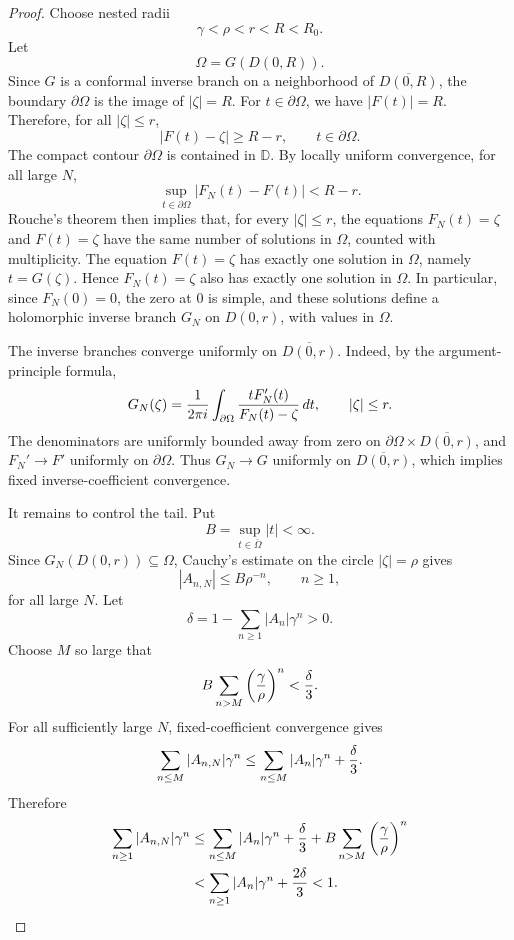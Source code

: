 \documentclass[11pt]{article}
\newcommand{\D}{\mathbb D}
\newcommand{\1}{\mathbf 1}
\newcommand{\ol}{\overline}
\theoremstyle{plain}
\theoremstyle{definition}
\theoremstyle{remark}
\begin{document}
\begin{proof}
Choose nested radii
\[
  \gamma<\rho<r<R<R_0.
\]
Let
\[
  \Omega=G(D(0,R)).
\]
Since \(G\) is a conformal inverse branch on a neighborhood of \(\ol{D(0,R)}\), the boundary \(\partial\Omega\) is the image of \(|\zeta|=R\).  For \(t\in\partial\Omega\), we have \(|F(t)|=R\).  Therefore, for all \(|\zeta|\le r\),
\[
  |F(t)-\zeta|\ge R-r,
  \qquad t\in\partial\Omega.
\]
The compact contour \(\partial\Omega\) is contained in \(\D\).  By locally uniform convergence, for all large \(N\),
\[
  \sup_{t\in\partial\Omega}|F_N(t)-F(t)|<R-r.
\]
Rouche's theorem then implies that, for every \(|\zeta|\le r\), the equations \(F_N(t)=\zeta\) and \(F(t)=\zeta\) have the same number of solutions in \(\Omega\), counted with multiplicity.  The equation \(F(t)=\zeta\) has exactly one solution in \(\Omega\), namely \(t=G(\zeta)\).  Hence \(F_N(t)=\zeta\) also has exactly one solution in \(\Omega\).  In particular, since \(F_N(0)=0\), the zero at \(0\) is simple, and these solutions define a holomorphic inverse branch \(G_N\) on \(D(0,r)\), with values in \(\Omega\).

The inverse branches converge uniformly on \(\ol{D(0,r)}\).  Indeed, by the argument-principle formula,
\[
  G_N(\zeta)= {1\over 2\pi i}\int_{\partial\Omega}
  {tF_N'(t)\over F_N(t)-\zeta}\,dt,
  \qquad |\zeta|\le r.
\]
The denominators are uniformly bounded away from zero on \(\partial\Omega\times\ol{D(0,r)}\), and \(F_N'\to F'\) uniformly on \(\partial\Omega\).  Thus \(G_N\to G\) uniformly on \(\ol{D(0,r)}\), which implies fixed inverse-coefficient convergence.

It remains to control the tail.  Put
\[
  B=\sup_{t\in\ol\Omega}|t|<\infty.
\]
Since \(G_N(D(0,r))\subseteq\Omega\), Cauchy's estimate on the circle \(|\zeta|=\rho\) gives
\[
  |A_{n,N}|\le B\rho^{-n},
  \qquad n\ge1,
\]
for all large \(N\).  Let
\[
  \delta=1-\sum_{n\ge1}|A_n|\gamma^n>0.
\]
Choose \(M\) so large that
\[
  B\sum_{n>M}\left({\gamma\over\rho}\right)^n< {\delta\over3}.
\]
For all sufficiently large \(N\), fixed-coefficient convergence gives
\[
  \sum_{n\le M}|A_{n,N}|\gamma^n
  \le \sum_{n\le M}|A_n|\gamma^n+{\delta\over3}.
\]
Therefore
\begin{align*}
  \sum_{n\ge1}|A_{n,N}|\gamma^n
  &\le \sum_{n\le M}|A_n|\gamma^n+{\delta\over3}
  +B\sum_{n>M}\left({\gamma\over\rho}\right)^n\\
  &< \sum_{n\ge1}|A_n|\gamma^n+{2\delta\over3}<1.
\end{align*}
\end{proof}
\end{document}
